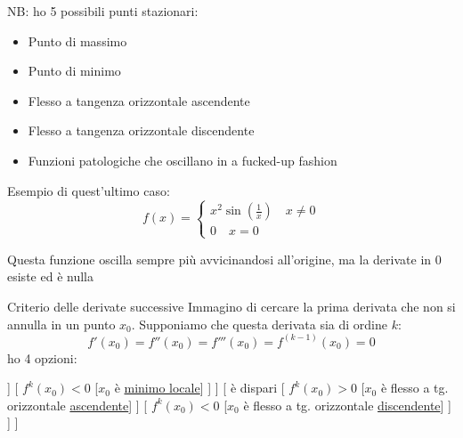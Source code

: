 NB: ho 5 possibili punti stazionari:
\begin{itemize}
	\item Punto di massimo
	\item Punto di minimo
	\item Flesso a tangenza orizzontale ascendente
	\item Flesso a tangenza orizzontale discendente
	\item Funzioni patologiche che oscillano in a fucked-up fashion
\end{itemize}
Esempio di quest'ultimo caso:
\[
	f\left( x \right)  =
	\begin{cases}
		x^2 \sin \left( \frac{1}{x} \right) \quad x \neq 0 \\
		0 \quad x=0
	\end{cases}
\]
\begin{center}
\end{center}
Questa funzione oscilla sempre più avvicinandosi all'origine, ma la derivate in 0 esiste ed è nulla
\begin{teorema}{Criterio delle derivate successive}
Immagino di cercare la prima derivata che non si annulla in un punto $ x_0 $. Supponiamo che questa derivata sia di ordine $ k $:
\[
	f'\left( x_0 \right) =f''\left( x_0 \right) =f'''\left( x_0 \right)=f^{\left( k-1 \right) }\left( x_0 \right)  =0
\]
ho 4 opzioni:

\begin{center}
	\begin{forest}
		[k, for tree={forked edges, draw=gray!20, align=left, grow'=0}
				[ è pari
						[ $ f^{k}(x_0) > 0 $
							[$x_0$ è \underline{minimo locale}]
						]
						[ $ f^{k}(x_0) < 0 $
							[$x_0$ è \underline{minimo locale}]
						]
				]
				[ è dispari
						[ $ f^{k}(x_0) > 0 $
							[$x_0$ è flesso a tg. orizzontale \underline{ascendente}]
						]
						[ $ f^{k}(x_0) < 0 $
							[$x_0$ è flesso a tg. orizzontale \underline{discendente}]
						]
				]
		]
	\end{forest}
\end{center}
\end{teorema}

